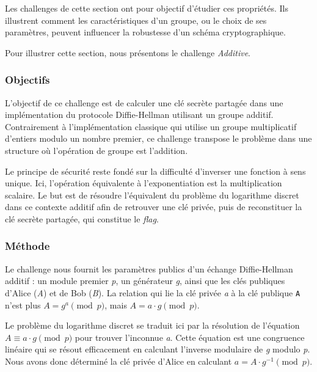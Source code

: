     Les challenges de cette section ont pour objectif d'étudier ces
    propriétés. Ils illustrent comment les caractéristiques d'un groupe, ou le
    choix de ses paramètres, peuvent influencer la robustesse d'un schéma
    cryptographique.

    Pour illustrer cette section, nous présentons le challenge \textit{Additive}.

    \subsubsection{Objectifs}
    \begin{sloppypar}
    L'objectif de ce challenge est de calculer une clé secrète partagée dans une
    implémentation du protocole Diffie-Hellman utilisant un groupe additif.
    Contrairement à l'implémentation classique qui utilise un groupe
    multiplicatif d'entiers modulo un nombre premier, ce challenge transpose le
    problème dans une structure où l'opération de groupe est l'addition.
    \end{sloppypar}

    Le principe de sécurité reste fondé sur la difficulté d'inverser une
    fonction à sens unique. Ici, l'opération équivalente à l'exponentiation est
    la multiplication scalaire. Le but est de résoudre l'équivalent du problème
    du logarithme discret dans ce contexte additif afin de retrouver une clé
    privée, puis de reconstituer la clé secrète partagée, qui constitue le
    \textit{flag}.

    \subsubsection{Méthode}
    Le challenge nous fournit les paramètres publics d'un échange
    Diffie-Hellman additif : un module premier \textit{p}, un générateur
    \textit{g}, ainsi que les clés publiques d'Alice (\textit{A}) et de Bob
    (\textit{B}). La relation qui lie la clé privée \textit{a} à la clé
    publique \texttt{A} n'est plus $A = g^a \pmod{p}$, mais
    $A = a \cdot g \pmod{p}$.

    Le problème du logarithme discret se traduit ici par la résolution de
    l'équation $A \equiv a \cdot g \pmod{p}$ pour trouver l'inconnue
    \textit{a}. Cette équation est une congruence linéaire qui se résout
    efficacement en calculant l'inverse modulaire de \textit{g} modulo
    \textit{p}. Nous avons donc déterminé la clé privée d'Alice en calculant
    $a = A \cdot g^{-1} \pmod{p}$.

